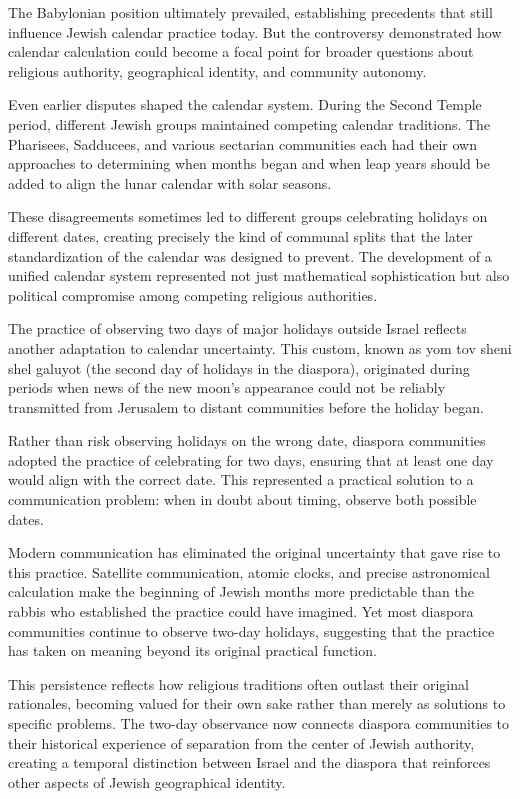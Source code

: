 The Babylonian position ultimately prevailed, establishing precedents that still influence Jewish calendar practice today. But the controversy demonstrated how calendar calculation could become a focal point for broader questions about religious authority, geographical identity, and community autonomy.

Even earlier disputes shaped the calendar system. During the Second Temple period, different Jewish groups maintained competing calendar traditions. The Pharisees, Sadducees, and various sectarian communities each had their own approaches to determining when months began and when leap years should be added to align the lunar calendar with solar seasons.

These disagreements sometimes led to different groups celebrating holidays on different dates, creating precisely the kind of communal splits that the later standardization of the calendar was designed to prevent. The development of a unified calendar system represented not just mathematical sophistication but also political compromise among competing religious authorities.

The practice of observing two days of major holidays outside Israel reflects another adaptation to calendar uncertainty. This custom, known as yom tov sheni shel galuyot (the second day of holidays in the diaspora), originated during periods when news of the new moon's appearance could not be reliably transmitted from Jerusalem to distant communities before the holiday began.

Rather than risk observing holidays on the wrong date, diaspora communities adopted the practice of celebrating for two days, ensuring that at least one day would align with the correct date. This represented a practical solution to a communication problem: when in doubt about timing, observe both possible dates.

Modern communication has eliminated the original uncertainty that gave rise to this practice. Satellite communication, atomic clocks, and precise astronomical calculation make the beginning of Jewish months more predictable than the rabbis who established the practice could have imagined. Yet most diaspora communities continue to observe two-day holidays, suggesting that the practice has taken on meaning beyond its original practical function.

This persistence reflects how religious traditions often outlast their original rationales, becoming valued for their own sake rather than merely as solutions to specific problems. The two-day observance now connects diaspora communities to their historical experience of separation from the center of Jewish authority, creating a temporal distinction between Israel and the diaspora that reinforces other aspects of Jewish geographical identity.


